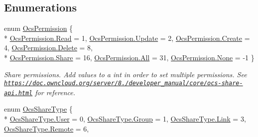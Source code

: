 \subsection*{Enumerations}
\begin{DoxyCompactItemize}
\item 
enum \hyperlink{namespaceowncloudsharp_a86ba7b86b85c7f5be2304a1ef7ae3157}{Ocs\+Permission} \{ \\*
\hyperlink{namespaceowncloudsharp_a86ba7b86b85c7f5be2304a1ef7ae3157a7a1a5f3e79fdc91edf2f5ead9d66abb4}{Ocs\+Permission.\+Read} = 1, 
\hyperlink{namespaceowncloudsharp_a86ba7b86b85c7f5be2304a1ef7ae3157a06933067aafd48425d67bcb01bba5cb6}{Ocs\+Permission.\+Update} = 2, 
\hyperlink{namespaceowncloudsharp_a86ba7b86b85c7f5be2304a1ef7ae3157a686e697538050e4664636337cc3b834f}{Ocs\+Permission.\+Create} = 4, 
\hyperlink{namespaceowncloudsharp_a86ba7b86b85c7f5be2304a1ef7ae3157af2a6c498fb90ee345d997f888fce3b18}{Ocs\+Permission.\+Delete} = 8, 
\\*
\hyperlink{namespaceowncloudsharp_a86ba7b86b85c7f5be2304a1ef7ae3157a5a95a425f74314a96f13a2f136992178}{Ocs\+Permission.\+Share} = 16, 
\hyperlink{namespaceowncloudsharp_a86ba7b86b85c7f5be2304a1ef7ae3157ab1c94ca2fbc3e78fc30069c8d0f01680}{Ocs\+Permission.\+All} = 31, 
\hyperlink{namespaceowncloudsharp_a86ba7b86b85c7f5be2304a1ef7ae3157a6adf97f83acf6453d4a6a4b1070f3754}{Ocs\+Permission.\+None} = -\/1
 \}\begin{DoxyCompactList}\small\item\em Share permissions. Add values to a int in order to set multiple permissions. See {\ttfamily \href{https://doc.owncloud.org/server/8.2/developer_manual/core/ocs-share-api.html}{\tt https\+://doc.\+owncloud.\+org/server/8./developer\+\_\+manual/core/ocs-\/share-\/api.\+html}} for reference. \end{DoxyCompactList}
\item 
enum \hyperlink{namespaceowncloudsharp_a51141c9a2e84eaced736ab96ea4b2f0b}{Ocs\+Share\+Type} \{ \\*
\hyperlink{namespaceowncloudsharp_a51141c9a2e84eaced736ab96ea4b2f0ba8f9bfe9d1345237cb3b2b205864da075}{Ocs\+Share\+Type.\+User} = 0, 
\hyperlink{namespaceowncloudsharp_a51141c9a2e84eaced736ab96ea4b2f0ba03937134cedab9078be39a77ee3a48a0}{Ocs\+Share\+Type.\+Group} = 1, 
\hyperlink{namespaceowncloudsharp_a51141c9a2e84eaced736ab96ea4b2f0ba97e7c9a7d06eac006a28bf05467fcc8b}{Ocs\+Share\+Type.\+Link} = 3, 
\hyperlink{namespaceowncloudsharp_a51141c9a2e84eaced736ab96ea4b2f0baf8508f576cd3f742dfc268258dcdf0dd}{Ocs\+Share\+Type.\+Remote} = 6, 

\end{DoxyCompactItemize}
